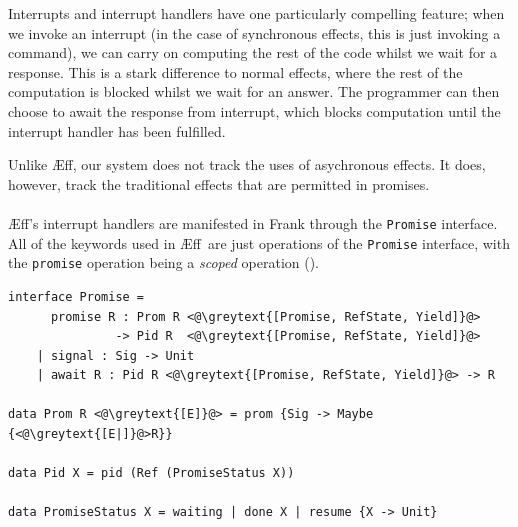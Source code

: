 \documentclass[msc,deptreport,cs]{infthesis} %
\newcommand{\code}[1]{\lstinline{#1}}
\newcommand{\greytext}[1]{\textcolor{black!40}{#1}}
\newcommand\aeff{{\AE}ff\xspace}
\begin{document}
Interrupts and interrupt handlers have one particularly compelling feature; when
we invoke an interrupt (in the case of synchronous effects, this is just
invoking a command), we can carry on computing the rest of the code whilst we
wait for a response. This is a stark difference to normal effects, where the
rest of the computation is blocked whilst we wait for an answer. The programmer
can then choose to await the response from interrupt, which blocks
computation until the interrupt handler has been fulfilled.

Unlike \aeff, our system does not track the uses of asychronous effects. It
does, however, track the traditional effects that are permitted in promises.


\paragraph*{}

\aeff's interrupt handlers are manifested in Frank through the \code{Promise}
interface. All of the keywords used in \aeff~are just operations of the
\code{Promise} interface, with the \code{promise} operation being a \emph{scoped}
operation (\cite{pirog2018syntax}).





\begin{lstlisting}
interface Promise =
      promise R : Prom R <@\greytext{[Promise, RefState, Yield]}@>
               -> Pid R  <@\greytext{[Promise, RefState, Yield]}@>
    | signal : Sig -> Unit
    | await R : Pid R <@\greytext{[Promise, RefState, Yield]}@> -> R

data Prom R <@\greytext{[E]}@> = prom {Sig -> Maybe {<@\greytext{[E|]}@>R}}

data Pid X = pid (Ref (PromiseStatus X))

data PromiseStatus X = waiting | done X | resume {X -> Unit}
\end{lstlisting}
\end{document}
